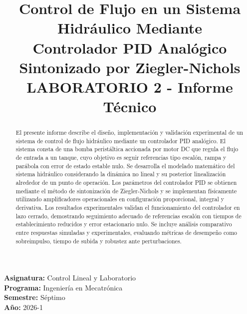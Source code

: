 \documentclass[conference]{IEEEtran}
\begin{document}
\raggedbottom

\title{Control de Flujo en un Sistema Hidráulico Mediante\\Controlador PID Analógico Sintonizado por Ziegler-Nichols\\
{\normalsize LABORATORIO 2 - Informe Técnico}}

\author{
\and
{}
}

\maketitle
\thispagestyle{fancy}

\begin{center}
\textbf{Asignatura:} Control Lineal y Laboratorio\\
\textbf{Programa:} Ingeniería en Mecatrónica\\
\textbf{Semestre:} Séptimo\\
\textbf{Año:} 2026-1
\end{center}

\begin{abstract}
El presente informe describe el diseño, implementación y validación experimental de un sistema de control de flujo hidráulico mediante un controlador PID analógico. El sistema consta de una bomba peristáltica accionada por motor DC que regula el flujo de entrada a un tanque, cuyo objetivo es seguir referencias tipo escalón, rampa y parábola con error de estado estable nulo. Se desarrolla el modelado matemático del sistema hidráulico considerando la dinámica no lineal y su posterior linealización alrededor de un punto de operación. Los parámetros del controlador PID se obtienen mediante el método de sintonización de Ziegler-Nichols y se implementan físicamente utilizando amplificadores operacionales en configuración proporcional, integral y derivativa. Los resultados experimentales validan el funcionamiento del controlador en lazo cerrado, demostrando seguimiento adecuado de referencias escalón con tiempos de establecimiento reducidos y error estacionario nulo. Se incluye análisis comparativo entre respuestas simuladas y experimentales, evaluando métricas de desempeño como sobreimpulso, tiempo de subida y robustez ante perturbaciones.
\end{abstract}
\end{document}
